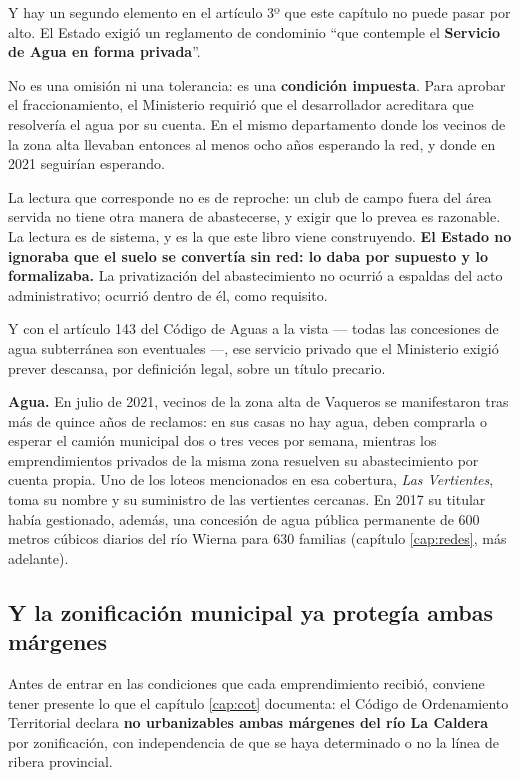 \begin{cautela}
Y hay un segundo elemento en el artículo 3º que este capítulo no puede pasar por alto. El Estado exigió un reglamento de condominio ``que contemple el \textbf{Servicio de Agua en forma privada}''.

No es una omisión ni una tolerancia: es una \textbf{condición impuesta}. Para aprobar el fraccionamiento, el Ministerio requirió que el desarrollador acreditara que resolvería el agua por su cuenta. En el mismo departamento donde los vecinos de la zona alta llevaban entonces al menos ocho años esperando la red, y donde en 2021 seguirían esperando.

La lectura que corresponde no es de reproche: un club de campo fuera del área servida no tiene otra manera de abastecerse, y exigir que lo prevea es razonable. La lectura es de sistema, y es la que este libro viene construyendo. \textbf{El Estado no ignoraba que el suelo se convertía sin red: lo daba por supuesto y lo formalizaba.} La privatización del abastecimiento no ocurrió a espaldas del acto administrativo; ocurrió dentro de él, como requisito.

Y con el artículo 143 del Código de Aguas a la vista --- todas las concesiones de agua subterránea son eventuales ---, ese servicio privado que el Ministerio exigió prever descansa, por definición legal, sobre un título precario.
\end{cautela}

\textbf{Agua.} En julio de 2021, vecinos de la zona alta de Vaqueros se manifestaron tras más de quince años de reclamos: en sus casas no hay agua, deben comprarla o esperar el camión municipal dos o tres veces por semana, mientras los emprendimientos privados de la misma zona resuelven su abastecimiento por cuenta propia. Uno de los loteos mencionados en esa cobertura, \textit{Las Vertientes}, toma su nombre y su suministro de las vertientes cercanas. En 2017 su titular había gestionado, además, una concesión de agua pública permanente de 600 metros cúbicos diarios del río Wierna para 630 familias (capítulo \ref{cap:redes}, más adelante).

\subsection*{Y la zonificación municipal ya protegía ambas márgenes}

Antes de entrar en las condiciones que cada emprendimiento recibió, conviene tener presente lo
que el capítulo \ref{cap:cot} documenta: el Código de Ordenamiento Territorial declara \textbf{no
urbanizables ambas márgenes del río La Caldera} por zonificación, con independencia de que se
haya determinado o no la línea de ribera provincial.

